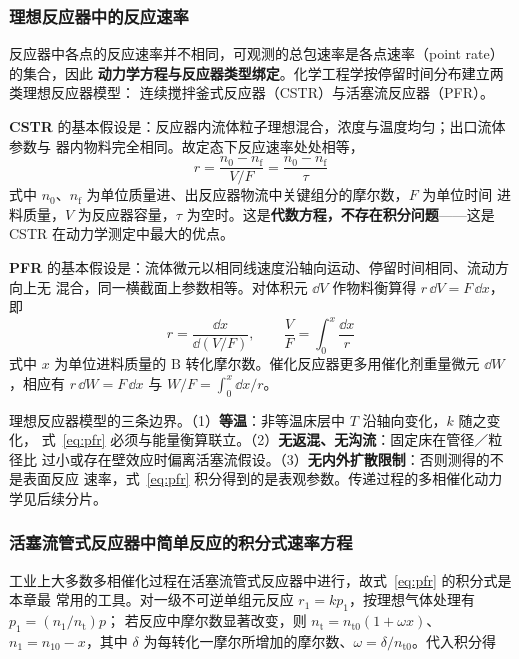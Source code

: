 \subsubsection{理想反应器中的反应速率}

反应器中各点的反应速率并不相同，可观测的总包速率是各点速率（point rate）的集合，因此
\textbf{动力学方程与反应器类型绑定}。化学工程学按停留时间分布建立两类理想反应器模型：
连续搅拌釜式反应器（CSTR）与活塞流反应器（PFR）。

\textbf{CSTR} 的基本假设是：反应器内流体粒子理想混合，浓度与温度均匀；出口流体参数与
器内物料完全相同。故定态下反应速率处处相等，
\begin{equation}
r=\frac{n_0-n_{\mathrm f}}{V/F}=\frac{n_0-n_{\mathrm f}}{\tau}
\label{eq:cstr}
\end{equation}
式中 $n_0$、$n_{\mathrm f}$ 为单位质量进、出反应器物流中关键组分的摩尔数，$F$ 为单位时间
进料质量，$V$ 为反应器容量，$\tau$ 为空时。这是\textbf{代数方程，不存在积分问题}——这是
CSTR 在动力学测定中最大的优点。

\textbf{PFR} 的基本假设是：流体微元以相同线速度沿轴向运动、停留时间相同、流动方向上无
混合，同一横截面上参数相等。对体积元 $\dd V$ 作物料衡算得 $r\,\dd V=F\,\dd x$，即
\begin{equation}
r=\frac{\dd x}{\dd(V/F)},
\qquad
\frac{V}{F}=\int_0^{x}\frac{\dd x}{r}
\label{eq:pfr}
\end{equation}
式中 $x$ 为单位进料质量的 $\mathrm{B}$ 转化摩尔数。催化反应器更多用催化剂重量微元
$\dd W$，相应有 $r\,\dd W=F\,\dd x$ 与 $W/F=\int_0^x\dd x/r$。

\begin{keycond}
理想反应器模型的三条边界。（1）\textbf{等温}：非等温床层中 $T$ 沿轴向变化，$k$ 随之变化，
式~\eqref{eq:pfr} 必须与能量衡算联立。（2）\textbf{无返混、无沟流}：固定床在管径／粒径比
过小或存在壁效应时偏离活塞流假设。（3）\textbf{无内外扩散限制}：否则测得的不是表面反应
速率，式~\eqref{eq:pfr} 积分得到的是表观参数。传递过程的多相催化动力学见后续分片。
\end{keycond}

\subsubsection{活塞流管式反应器中简单反应的积分式速率方程}

工业上大多数多相催化过程在活塞流管式反应器中进行，故式~\eqref{eq:pfr} 的积分式是本章最
常用的工具。对一级不可逆单组元反应 $r_1=kp_1$，按理想气体处理有 $p_1=(n_1/n_{\mathrm t})p$；
若反应中摩尔数显著改变，则 $n_{\mathrm t}=n_{\mathrm t0}(1+\omega x)$、$n_1=n_{10}-x$，其中
$\delta$ 为每转化一摩尔所增加的摩尔数、$\omega=\delta/n_{\mathrm t0}$。代入积分得

